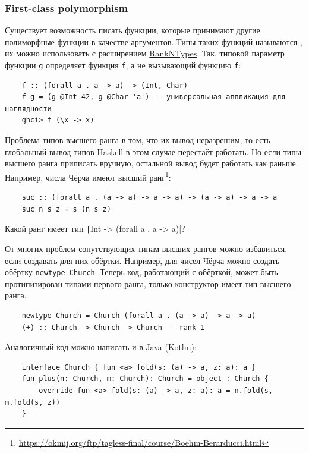 \subsubsection{First-class polymorphism} \label{subsubsec:first-class-polymorphism}

Существует возможность писать функции, которые принимают другие полиморфные функции в качестве аргументов.
Типы таких функций называются , их можно использовать с расширением \href{https://downloads.haskell.org/ghc/latest/docs/users_guide/exts/rank_polymorphism.html}{RankNTypes}.
Так, типовой параметр функции \texttt{g} определяет функция \texttt{f}, а не вызывающий функцию \texttt{f}:
\begin{verbatim}
    f :: (forall a . a -> a) -> (Int, Char)
    f g = (g @Int 42, g @Char 'a') -- универсальная аппликация для наглядности
    ghci> f (\x -> x)
\end{verbatim}

Проблема типов высшего ранга в том, что их вывод неразрешим, то есть глобальный вывод типов Haskell в этом случае перестаёт работать.
Но если типы высшего ранга приписать вручную, остальной вывод будет работать как раньше.
Например, числа Чёрча имеют высший ранг\footnote{\url{https://okmij.org/ftp/tagless-final/course/Boehm-Berarducci.html}}:
\begin{verbatim}
    suc :: (forall a . (a -> a) -> a -> a) -> (a -> a) -> a -> a
    suc n s z = s (n s z)
\end{verbatim}

\begin{task}
    Какой ранг имеет тип \texttt|Int -> (forall a . a -> a)|?
\end{task}

От многих проблем сопутствующих типам высших рангов можно избавиться, если создавать для них обёртки.
Например, для чисел Чёрча можно создать обёртку \texttt{newtype Church}.
Теперь код, работающий с обёрткой, может быть протипизирован типами первого ранга, только конструктор имеет тип высшего ранга.
\begin{verbatim}
    newtype Church = Church (forall a . (a -> a) -> a -> a)
    (+) :: Church -> Church -> Church -- rank 1
\end{verbatim}
Аналогичный код можно написать и в Java (Kotlin):
\begin{verbatim}
    interface Church { fun <a> fold(s: (a) -> a, z: a): a }
    fun plus(n: Church, m: Church): Church = object : Church {
        override fun <a> fold(s: (a) -> a, z: a): a = n.fold(s, m.fold(s, z))
    }
\end{verbatim}

